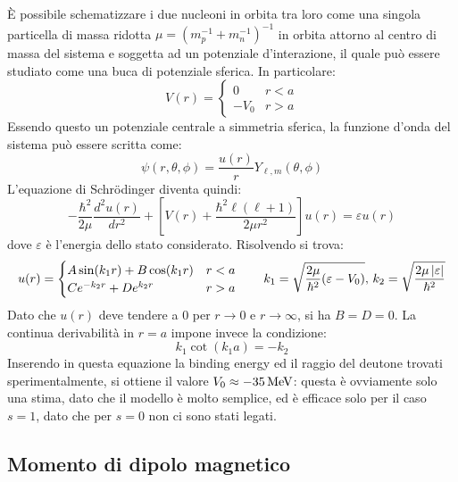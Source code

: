 È possibile schematizzare i due nucleoni in orbita tra loro come una singola particella di massa ridotta $ \mu = (m_p^{-1} + m_n^{-1})^{-1} $ in orbita attorno al centro di massa del sistema e soggetta ad un potenziale d'interazione, il quale può essere studiato come una buca di potenziale sferica. In particolare:
\begin{equation}
	V(r) =
	\begin{cases}
		0 & r < a \\
		-V_0 & r > a
	\end{cases}
	\label{eq:4.6}
\end{equation}
Essendo questo un potenziale centrale a simmetria sferica, la funzione d'onda del sistema può essere scritta come:
\begin{equation}
	\psi(r,\theta,\phi) = \frac{u(r)}{r} Y_{\ell,m}(\theta,\phi)
	\label{eq:4.7}
\end{equation}
L'equazione di Schrödinger diventa quindi:
\begin{equation}
	- \frac{\hbar^2}{2\mu} \frac{d^2 u(r)}{dr^2} + \left[ V(r) + \frac{\hbar^2 \ell (\ell + 1)}{2\mu r^2} \right] u(r) = \varepsilon u(r)
	\label{eq:4.8}
\end{equation}
dove $ \varepsilon $ è l'energia dello stato considerato. Risolvendo si trova:
\begin{equation}
	u(r) =
	\begin{cases}
		A \sin (k_1 r) + B \cos (k_1 r) & r < a \\
		C e^{-k_2 r} + D e^{k_2 r} & r > a
	\end{cases}
	\qquad
	k_1 = \sqrt{\frac{2\mu}{\hbar^2} (\varepsilon - V_0)}, \, k_2 = \sqrt{\frac{2\mu \left\lvert\varepsilon\right\rvert}{\hbar^2}}
	\label{eq:4.9}
\end{equation}
Dato che $ u(r) $ deve tendere a $ 0 $ per $ r \rightarrow 0 $ e $ r \rightarrow \infty $, si ha $ B = D = 0 $. La continua derivabilità in $ r = a $ impone invece la condizione:
\begin{equation}
	k_1 \cot (k_1 a) = - k_2
	\label{eq:4.10}
\end{equation}
Inserendo in questa equazione la binding energy ed il raggio del deutone trovati sperimentalmente, si ottiene il valore $ V_0 \approx -35\,\mathrm{MeV} $: questa è ovviamente solo una stima, dato che il modello è molto semplice, ed è efficace solo per il caso $ s = 1 $, dato che per $ s = 0 $ non ci sono stati legati.

\subsection{Momento di dipolo magnetico}

